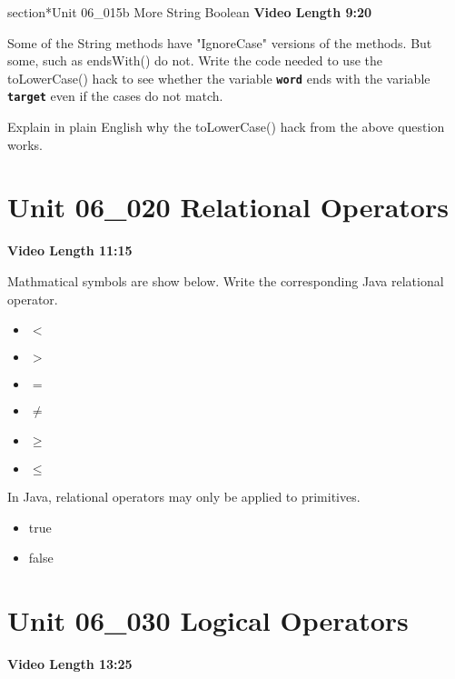 \documentclass[letterpaper,12pt]{exam}
\newcommand{\unit}{Unit 06}
\begin{document}
\begin{questions}
section*{\unit\_015b More String Boolean } %
\noindent \textbf{Video Length 9:20}

\begin{samepage}
    \question Some of the String methods have "IgnoreCase" versions of the methods.  But some, such as endsWith() do not.  Write the code needed to use the toLowerCase() hack to see whether the variable \texttt{\textbf{word}} ends with the variable \texttt{\textbf{target}} even if the cases do not match.
    \vspace{5mm}
\end{samepage}

\begin{samepage}
    \question Explain in plain English why the toLowerCase() hack from the above question works.
    \vspace{5mm}
\end{samepage}

\section*{\unit\_020 Relational Operators} %
\noindent \textbf{Video Length 11:15}

\begin{samepage}
    \question Mathmatical symbols are show below.  Write the corresponding Java relational operator.
      \begin{itemize}
        \item $<$
        \item $>$
        \item $=$
        \item $\neq$
        \item $\ge$
        \item $\le$
        \vspace{5mm}
       \end{itemize}
\end{samepage}

\begin{samepage}
    \question In Java, relational operators may only be applied to primitives.
      \begin{itemize}
        \item true
        \item false
       \end{itemize}
\end{samepage}
\clearpage
\section*{\unit\_030 Logical Operators} %
\noindent \textbf{Video Length 13:25}


\end{questions}
\end{document}
